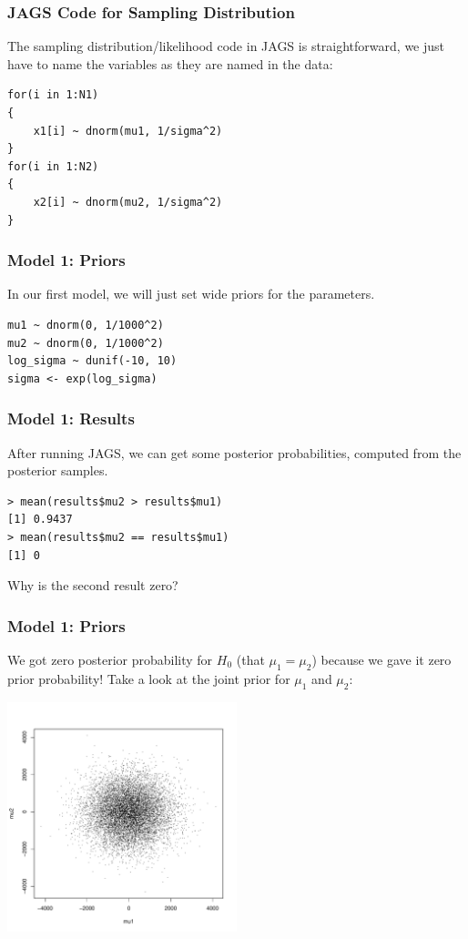 \documentclass{beamer}
\begin{document}
\begin{frame}[fragile]
\frametitle{JAGS Code for Sampling Distribution}
The sampling distribution/likelihood code in JAGS is straightforward,
we just have to name the variables as they are named in the data:
\begin{verbatim}
for(i in 1:N1)
{
    x1[i] ~ dnorm(mu1, 1/sigma^2)
}
for(i in 1:N2)
{
    x2[i] ~ dnorm(mu2, 1/sigma^2)
}
\end{verbatim}

\end{frame}


\begin{frame}[fragile]
\frametitle{Model 1: Priors}
In our first model, we will just set wide priors for the parameters.

\begin{verbatim}
mu1 ~ dnorm(0, 1/1000^2)
mu2 ~ dnorm(0, 1/1000^2)
log_sigma ~ dunif(-10, 10)
sigma <- exp(log_sigma)
\end{verbatim}

\end{frame}


\begin{frame}[fragile]
\frametitle{Model 1: Results}
After running JAGS, we can get some posterior probabilities,
computed from the posterior samples.

\begin{verbatim}
> mean(results$mu2 > results$mu1)
[1] 0.9437
> mean(results$mu2 == results$mu1)
[1] 0
\end{verbatim}
\pause

Why is the second result zero?



\end{frame}


\begin{frame}[fragile]
\frametitle{Model 1: Priors}
We got zero posterior probability for $H_0$ (that $\mu_1 = \mu_2$)
because we gave it zero prior probability! Take a look at the joint prior
for $\mu_1$ and $\mu_2$:
\vspace{-1.5em}
\begin{center}
\includegraphics[width=0.5\textwidth]{images/ttest_prior1.pdf}
\end{center}


\end{frame}
\end{document}
